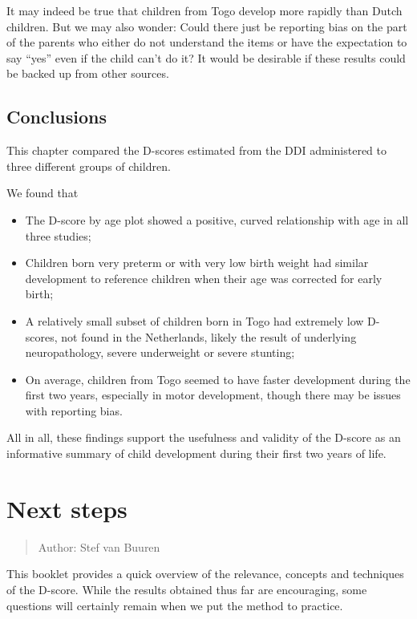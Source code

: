 \documentclass[
]{book}
\begin{document}
It may indeed be true that children from Togo develop more rapidly than Dutch children. But we may also wonder: Could there just be reporting bias on the part of the parents who either do not understand the items or have the expectation to say ``yes'' even if the child can't do it? It would be desirable if these results could be backed up from other sources.

\hypertarget{sec:threestudiesconclusions}{%
\section{Conclusions}\label{sec:threestudiesconclusions}}

This chapter compared the D-scores estimated from the DDI administered to three different groups of children.

We found that

\begin{itemize}
\item
  The D-score by age plot showed a positive, curved relationship with age in all three studies;
\item
  Children born very preterm or with very low birth weight had similar development to reference children when their age was corrected for early birth;
\item
  A relatively small subset of children born in Togo had extremely low D-scores, not found in the Netherlands, likely the result of underlying neuropathology, severe underweight or severe stunting;
\item
  On average, children from Togo seemed to have faster development during the first two years, especially in motor development, though there may be issues with reporting bias.
\end{itemize}

All in all, these findings support the usefulness and validity of the D-score as an informative summary of child development during their first two years of life.

\hypertarget{ch:nextsteps}{%
\chapter{Next steps}\label{ch:nextsteps}}

\begin{quote}
Author: Stef van Buuren
\end{quote}

This booklet provides a quick overview of the relevance, concepts and techniques of the D-score. While the results obtained thus far are encouraging, some questions will certainly remain when we put the method to practice.
\end{document}
